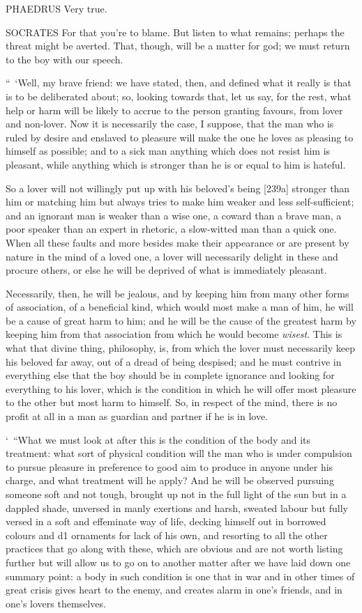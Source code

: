PHAEDRUS Very true.

 SOCRATES For that you're to blame. But listen to what remains;
perhaps the threat might be averted. That, though, will be a matter for
god; we must return to the boy with our speech.

“~‘Well, my brave friend:
we have stated, then, and defined what it really is that is to be
deliberated about; so, looking towards that, let us say, for the rest,
what help or harm will be  likely to accrue to the person
granting favours, from lover and non-lover. Now it is
necessarily the case, I
suppose, that the man who is ruled by desire and enslaved to pleasure
will make the one he loves as pleasing to himself as possible; and to a
sick man anything which does not resist him is pleasant, while 
anything which is stronger than he is or equal to him is hateful.

So a lover will not willingly put up with his beloved's being {[}239a{]}
stronger than him or matching him but always tries to make him weaker
and less self-sufficient; and an ignorant man is weaker than a wise one,
a coward than a brave man, a poor speaker than an expert in rhetoric, a
slow-witted man than a quick one. When all these faults and more besides
make their  appearance or are present by nature in the mind of a
loved one, a lover will necessarily delight in these and procure others,
or else he will be deprived of what is immediately pleasant.

Necessarily, then, he will be jealous, and by keeping him from 
many other forms of association, of a beneficial kind, which would most
make a man of him, he will be a cause of great harm to him; and he will
be the cause of the greatest harm by keeping him from that association
from which he would become
{\em wisest}. This is
what that divine thing, philosophy, is, from which the lover must
necessarily keep his beloved far  away, out of a dread of being
despised; and he must contrive in everything else that the boy should be
in complete ignorance and looking for everything to his lover, which is
the condition in which he will offer most pleasure to the other but most
harm to himself. So, in respect of the mind, there is no profit at all
in  a man as guardian and partner if he is in love.

‘~“What we must look at after this is the condition of the body and its
treatment: what sort of physical condition will the man who is under
compulsion to pursue pleasure in preference to good aim to produce in
anyone under his charge, and what  treatment will he apply? And
he will be observed pursuing someone soft and not tough, brought up not
in the full light of the sun but in a dappled shade, unversed in manly
exertions and harsh, sweated labour but fully versed in a soft and
effeminate way of life, decking himself out in borrowed colours and d1
ornaments for lack of his own, and resorting to all the other practices
that go along with these, which are obvious and are not worth listing
further but will allow us to go on to another matter after we have laid
down one summary point: a body in  such condition is one that in
war and in other times of great crisis gives heart to the enemy, and
creates alarm in one's friends, and in one's lovers themselves.

